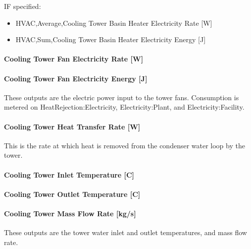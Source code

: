 IF specified:

\begin{itemize}
\item
  HVAC,Average,Cooling Tower Basin Heater Electricity Rate {[}W{]}
\item
  HVAC,Sum,Cooling Tower Basin Heater Electricity Energy {[}J{]}
\end{itemize}

\paragraph{Cooling Tower Fan Electricity Rate {[}W{]}}\label{cooling-tower-fan-electric-power-w-2}

\paragraph{Cooling Tower Fan Electricity Energy {[}J{]}}\label{cooling-tower-fan-electric-energy-j-2}

These outputs are the electric power input to the tower fans. Consumption is metered on HeatRejection:Electricity, Electricity:Plant, and Electricity:Facility.

\paragraph{Cooling Tower Heat Transfer Rate {[}W{]}}\label{cooling-tower-heat-transfer-rate-w-2}

This is the rate at which heat is removed from the condenser water loop by the tower.

\paragraph{Cooling Tower Inlet Temperature {[}C{]}}\label{cooling-tower-inlet-temperature-c-2}

\paragraph{Cooling Tower Outlet Temperature {[}C{]}}\label{cooling-tower-outlet-temperature-c-2}

\paragraph{Cooling Tower Mass Flow Rate {[}kg/s{]}}\label{cooling-tower-mass-flow-rate-kgs-2}

These outputs are the tower water inlet and outlet temperatures, and mass flow rate.

